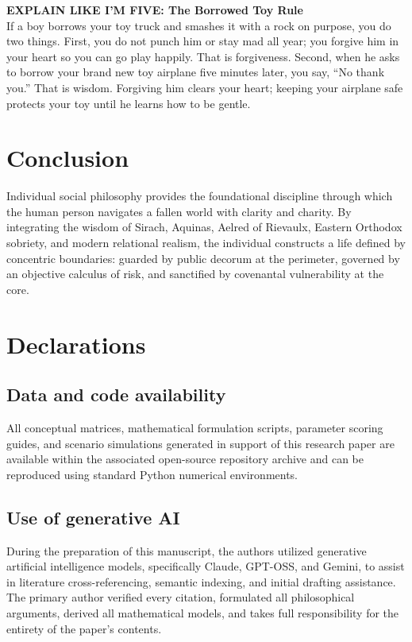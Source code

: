 \documentclass[11pt,twocolumn]{article}
\begin{document}
\begin{eli5box}
\textbf{EXPLAIN LIKE I'M FIVE: The Borrowed Toy Rule}\\
If a boy borrows your toy truck and smashes it with a rock on purpose, you do two things. First, you do not punch him or stay mad all year; you forgive him in your heart so you can go play happily. That is forgiveness. Second, when he asks to borrow your brand new toy airplane five minutes later, you say, ``No thank you.'' That is wisdom. Forgiving him clears your heart; keeping your airplane safe protects your toy until he learns how to be gentle.
\end{eli5box}

\section{Conclusion}
Individual social philosophy provides the foundational discipline through which the human person navigates a fallen world with clarity and charity. By integrating the wisdom of Sirach, Aquinas, Aelred of Rievaulx, Eastern Orthodox sobriety, and modern relational realism, the individual constructs a life defined by concentric boundaries: guarded by public decorum at the perimeter, governed by an objective calculus of risk, and sanctified by covenantal vulnerability at the core.

\section*{Declarations}

\subsection*{Data and code availability}
All conceptual matrices, mathematical formulation scripts, parameter scoring guides, and scenario simulations generated in support of this research paper are available within the associated open-source repository archive and can be reproduced using standard Python numerical environments.

\subsection*{Use of generative AI}
During the preparation of this manuscript, the authors utilized generative artificial intelligence models, specifically Claude, GPT-OSS, and Gemini, to assist in literature cross-referencing, semantic indexing, and initial drafting assistance. The primary author verified every citation, formulated all philosophical arguments, derived all mathematical models, and takes full responsibility for the entirety of the paper's contents.
\end{document}
